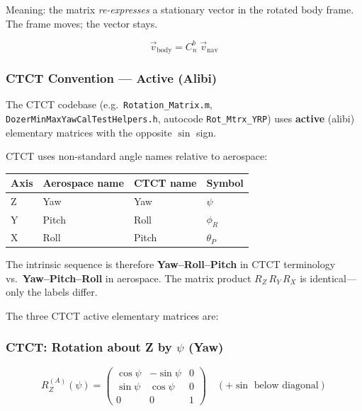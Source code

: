 \documentclass[12pt,a4paper]{article}
\begin{document}
Meaning: the matrix \emph{re-expresses} a stationary vector in the rotated
body frame.  The frame moves; the vector stays.

\[
  \vec{v}_{\text{body}} = C_n^b \;\vec{v}_{\text{nav}}
\]

\subsubsection*{CTCT Convention --- Active (Alibi)}

The CTCT codebase (e.g.\ \texttt{Rotation\_Matrix.m},
\texttt{DozerMinMaxYawCalTestHelpers.h}, autocode \texttt{Rot\_Mtrx\_YRP})
uses \textbf{active} (alibi) elementary matrices with the opposite $\sin$
sign.

\begin{warningbox}
CTCT uses non-standard angle names relative to aerospace:
\begin{center}
\begin{tabular}{@{}llll@{}}
\toprule
\textbf{Axis} & \textbf{Aerospace name} & \textbf{CTCT name} & \textbf{Symbol} \\
\midrule
Z & Yaw   & Yaw   & $\psi$ \\
Y & Pitch & Roll  & $\phi_R$ \\
X & Roll  & Pitch & $\theta_P$ \\
\bottomrule
\end{tabular}
\end{center}
The intrinsic sequence is therefore
\textbf{Yaw--Roll--Pitch} in CTCT terminology
vs.\ \textbf{Yaw--Pitch--Roll} in aerospace.
The matrix product $R_Z\,R_Y\,R_X$ is identical---only the labels differ.
\end{warningbox}

The three CTCT active elementary matrices are:

\subsubsection*{CTCT: Rotation about Z by $\psi$ (Yaw)}

\begin{equation}
  R_Z^{(A)}(\psi) = \begin{pmatrix}
    \cos\psi  & -\sin\psi & 0 \\
    \sin\psi  & \cos\psi  & 0 \\
    0          & 0          & 1
  \end{pmatrix}
  \quad (+\sin\text{ below diagonal})
  \label{eq:RzA}
\end{equation}
\end{document}

